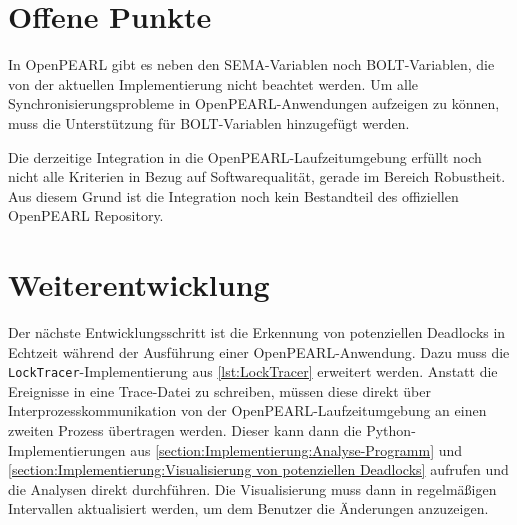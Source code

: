 \section{Offene Punkte}
\label{section:OffenePunkte}
In OpenPEARL gibt es neben den \textrm{SEMA}-Variablen noch
\textrm{BOLT}-Variablen, die von der aktuellen Implementierung nicht beachtet
werden. Um alle Synchronisierungsprobleme in OpenPEARL-Anwendungen aufzeigen zu
können, muss die Unterstützung für \textrm{BOLT}-Variablen hinzugefügt werden.

Die derzeitige Integration in die OpenPEARL-Laufzeitumgebung erfüllt noch nicht
alle Kriterien in Bezug auf Softwarequalität, gerade im Bereich Robustheit. Aus
diesem Grund ist die Integration noch kein Bestandteil des offiziellen OpenPEARL
Repository.

\section{Weiterentwicklung}
\label{section:Weiterentwicklung}
Der nächste Entwicklungsschritt ist die Erkennung von potenziellen Deadlocks in
Echtzeit während der Ausführung einer OpenPEARL-Anwendung. Dazu muss die
\texttt{LockTracer}-Implementierung aus \cref{lst:LockTracer} erweitert werden.
Anstatt die Ereignisse in eine Trace-Datei zu schreiben, müssen diese direkt
über Interprozesskommunikation von der OpenPEARL-Laufzeitumgebung an einen
zweiten Prozess übertragen werden. Dieser kann dann die Python-Implementierungen
aus \cref{section:Implementierung:Analyse-Programm} und
\cref{section:Implementierung:Visualisierung von potenziellen Deadlocks}
aufrufen und die Analysen direkt durchführen. Die Visualisierung muss dann in
regelmäßigen Intervallen aktualisiert werden, um dem Benutzer die Änderungen
anzuzeigen.